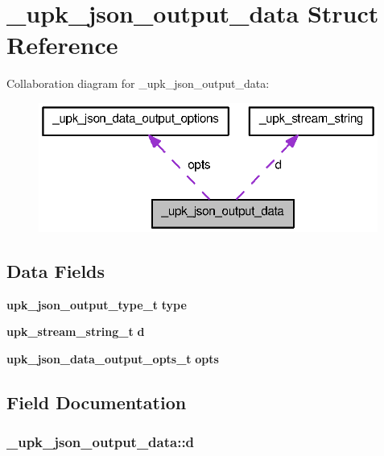 \section{\_\-upk\_\-json\_\-output\_\-data Struct Reference}
\label{struct__upk__json__output__data}


Collaboration diagram for \_\-upk\_\-json\_\-output\_\-data:\nopagebreak
\begin{figure}[H]
\begin{center}
\leavevmode
\includegraphics[width=316pt]{struct__upk__json__output__data__coll__graph}
\end{center}
\end{figure}
\subsection*{Data Fields}
\begin{DoxyCompactItemize}
\item 
{\bf upk\_\-json\_\-output\_\-type\_\-t} {\bf type}
\item 
{\bf upk\_\-stream\_\-string\_\-t} {\bf d}
\item 
{\bf upk\_\-json\_\-data\_\-output\_\-opts\_\-t} {\bf opts}
\end{DoxyCompactItemize}


\subsection{Field Documentation}
\subsubsection[{d}]{ {\bf \_\-upk\_\-json\_\-output\_\-data::d}}\label{struct__upk__json__output__data_a000ae48f20ba4c90b9597c3e5ac6ea30}


